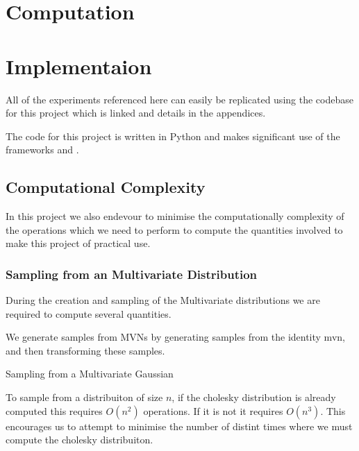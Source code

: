 \documentclass[12pt, a4paper]{report}
\theoremstyle{definition}
\theoremstyle{definition}
\theoremstyle{definition}
\begin{document}
\chapter{Computation}
\label{sec:Computation}


\chapter{Implementaion}
\label{sec:Implementaion}

All of the experiments referenced here can easily be replicated using the codebase for this project which is linked and details in the appendices.

The code for this project is written in Python and makes significant use of the frameworks \cite[Pytorch]{NEURIPS2019_9015} and \cite[GPytorch]{gardner2018gpytorch}.





\section{Computational Complexity}

In this project we also endevour to minimise the computationally complexity of the operations which we need to perform to compute the quantities involved to make this project of practical use.


\subsection{Sampling from an Multivariate Distribution}


During the creation and sampling of the Multivariate distributions we are required to compute several quantities.

We generate samples from MVNs by generating samples from the identity mvn, and then transforming these samples.

\begin{algorithm}[H]
    \SetAlgoLined
    \caption{Sampling from a Multivariate Gaussian}
\end{algorithm}

To sample from a distribuiton of size $n$, if the cholesky distribution is already computed this requires $O(n^2)$ operations. If it is not it requires $O(n^3)$. This encourages us to attempt to minimise the number of distint times where we must compute the cholesky distribuiton.
\end{document}
